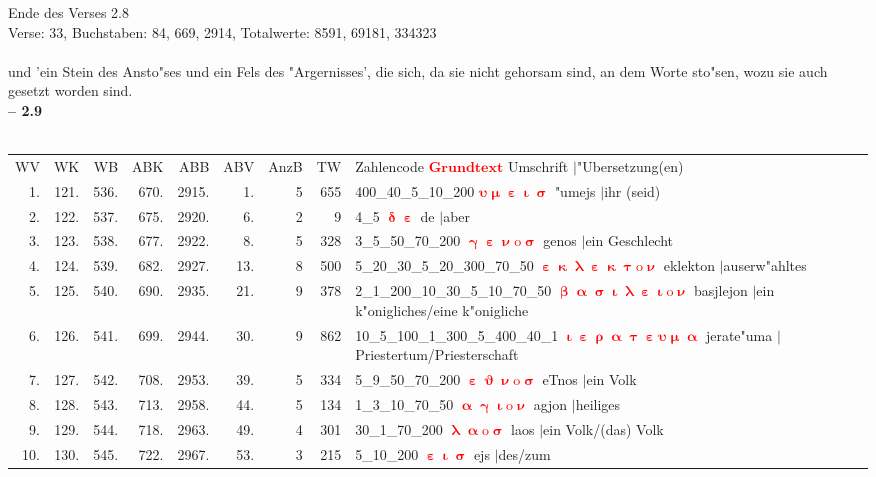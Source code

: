 \documentclass[a4paper,10pt,landscape]{article}
\begin{document}
Ende des Verses 2.8\\
Verse: 33, Buchstaben: 84, 669, 2914, Totalwerte: 8591, 69181, 334323\\
\\
und 'ein Stein des Ansto"ses und ein Fels des "Argernisses', die sich, da sie nicht gehorsam sind, an dem Worte sto"sen, wozu sie auch gesetzt worden sind.\\
\newpage 
{\bf -- 2.9}\\
\medskip \\
\begin{tabular}{rrrrrrrrp{120mm}}
WV&WK&WB&ABK&ABB&ABV&AnzB&TW&Zahlencode \textcolor{red}{$\boldsymbol{Grundtext}$} Umschrift $|$"Ubersetzung(en)\\
1.&121.&536.&670.&2915.&1.&5&655&400\_40\_5\_10\_200 \textcolor{red}{$\boldsymbol{\upsilon\upmu\upepsilon\upiota\upsigma}$} "umejs $|$ihr (seid)\\
2.&122.&537.&675.&2920.&6.&2&9&4\_5 \textcolor{red}{$\boldsymbol{\updelta\upepsilon}$} de $|$aber\\
3.&123.&538.&677.&2922.&8.&5&328&3\_5\_50\_70\_200 \textcolor{red}{$\boldsymbol{\upgamma\upepsilon\upnu\mathrm{o}\upsigma}$} genos $|$ein Geschlecht\\
4.&124.&539.&682.&2927.&13.&8&500&5\_20\_30\_5\_20\_300\_70\_50 \textcolor{red}{$\boldsymbol{\upepsilon\upkappa\uplambda\upepsilon\upkappa\uptau\mathrm{o}\upnu}$} eklekton $|$auserw"ahltes\\
5.&125.&540.&690.&2935.&21.&9&378&2\_1\_200\_10\_30\_5\_10\_70\_50 \textcolor{red}{$\boldsymbol{\upbeta\upalpha\upsigma\upiota\uplambda\upepsilon\upiota\mathrm{o}\upnu}$} basjlejon $|$ein k"onigliches/eine k"onigliche\\
6.&126.&541.&699.&2944.&30.&9&862&10\_5\_100\_1\_300\_5\_400\_40\_1 \textcolor{red}{$\boldsymbol{\upiota\upepsilon\uprho\upalpha\uptau\upepsilon\upsilon\upmu\upalpha}$} jerate"uma $|$Priestertum/Priesterschaft\\
7.&127.&542.&708.&2953.&39.&5&334&5\_9\_50\_70\_200 \textcolor{red}{$\boldsymbol{\upepsilon\upvartheta\upnu\mathrm{o}\upsigma}$} eTnos $|$ein Volk\\
8.&128.&543.&713.&2958.&44.&5&134&1\_3\_10\_70\_50 \textcolor{red}{$\boldsymbol{\upalpha\upgamma\upiota\mathrm{o}\upnu}$} agjon $|$heiliges\\
9.&129.&544.&718.&2963.&49.&4&301&30\_1\_70\_200 \textcolor{red}{$\boldsymbol{\uplambda\upalpha\mathrm{o}\upsigma}$} laos $|$ein Volk/(das) Volk\\
10.&130.&545.&722.&2967.&53.&3&215&5\_10\_200 \textcolor{red}{$\boldsymbol{\upepsilon\upiota\upsigma}$} ejs $|$des/zum\\

\end{tabular}
\end{document}
